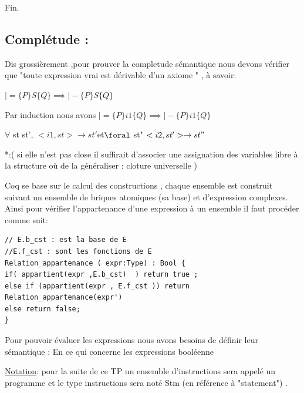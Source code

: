 \documentclass{article}
\begin{document}
\begin{itemize}
Fin. 

\subsection{ Complétude : }

\noindent Dis grossièrement ,pour prouver la completude sémantique  nous devons vérifier que  "toute expression vrai est dérivable d'un axiome " , à savoir:


$|= \{P\}S\{Q\} \implies |- \{P\}S\{Q\}  $  







Par induction nous avons $|= \{P\}i1\{Q\} \implies |- \{P\}i1\{Q\}$


$\forall$ st st', $< i1 , st > \rightarrow st'$et$\foral$ st" $< i2 , st' > \rightarrow st"$
\end{itemize}

*:( si elle n'est pas close il suffirait d'associer une assignation des variables libre à la structure où de la généraliser : cloture universelle   ) 





Coq se base sur le calcul des constructions , chaque ensemble est construit suivant un ensemble de briques atomiques (sa base) et d'expression complexes.
Ainsi pour vérifier l'appartenance d'une expression à un ensemble il faut procéder comme suit:
\begin{lstlisting}[style=CStyle]
// E.b_cst : est la base de E 
//E.f_cst : sont les fonctions de E 
Relation_appartenance ( expr:Type) : Bool {
if( appartient(expr ,E.b_cst)  ) return true ;
else if (appartient(expr , E.f_cst )) return Relation_appartenance(expr')
else return false;
}
\end{lstlisting}




Pour pouvoir évaluer les expressions nous avons besoins de définir leur sémantique :
En ce qui concerne les expressions booléenne 


\underline{Notation}: pour la suite de ce TP un ensemble d'instructions sera appelé un programme  et le type instructions sera noté Stm (en référence à "statement") .
\end{document}
